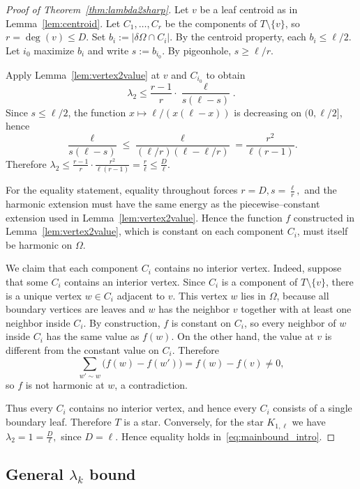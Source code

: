 \documentclass[11pt]{article}
\theoremstyle{definition}
\theoremstyle{remark}
\newcommand{\dO}{\delta\Omega}
\newcommand{\Om}{\Omega}
\begin{document}
\begin{proof}[Proof of Theorem~\ref{thm:lambda2sharp}]
Let $v$ be a leaf centroid as in Lemma~\ref{lem:centroid}.
Let $C_1,\dots,C_r$ be the components of $T\setminus\{v\}$, so $r=\deg(v)\le D$.
Set $b_i:=|\dO\cap C_i|$.
By the centroid property, each $b_i\le\ell/2$.
Let $i_0$ maximize $b_i$ and write $s:=b_{i_0}$.
By pigeonhole, $s\ge\ell/r$.

Apply Lemma~\ref{lem:vertex2value} at $v$ and $C_{i_0}$ to obtain
$$
\lambda_2\le \frac{r-1}{r}\cdot\frac{\ell}{s(\ell-s)}.
$$
Since $s\le\ell/2$, the function $x\mapsto\ell/(x(\ell-x))$ is decreasing on $(0,\ell/2]$, hence
$$
\frac{\ell}{s(\ell-s)}\le \frac{\ell}{(\ell/r)(\ell-\ell/r)}=\frac{r^2}{\ell(r-1)}.
$$
Therefore $\lambda_2\le \frac{r-1}{r}\cdot\frac{r^2}{\ell(r-1)}=\frac{r}{\ell}\le\frac{D}{\ell}$.

For the equality statement, equality throughout forces
$
r=D, s=\frac{\ell}{r},
$
and the harmonic extension must have the same energy as the piecewise--constant extension used in
Lemma~\ref{lem:vertex2value}. Hence the function $f$ constructed in Lemma~\ref{lem:vertex2value}, which is constant on each component
$C_i$, must itself be harmonic on $\Om$.

We claim that each component $C_i$ contains no interior vertex. Indeed, suppose that some $C_i$
contains an interior vertex. Since $C_i$ is a component of $T\setminus\{v\}$, there is a unique vertex
$w\in C_i$ adjacent to $v$. This vertex $w$ lies in $\Om$, because all boundary vertices are leaves
and $w$ has the neighbor $v$ together with at least one neighbor inside $C_i$. By construction, $f$
is constant on $C_i$, so every neighbor of $w$ inside $C_i$ has the same value as $f(w)$. On the other
hand, the value at $v$ is different from the constant value on $C_i$. Therefore
$$
\sum_{w'\sim w}\bigl(f(w)-f(w')\bigr)=f(w)-f(v)\neq 0,
$$
so $f$ is not harmonic at $w$, a contradiction.

Thus every $C_i$ contains no interior vertex, and hence every $C_i$ consists of a single boundary
leaf. Therefore $T$ is a star. Conversely, for the star $K_{1,\ell}$ we have
$
\lambda_2=1=\frac{D}{\ell},
$
since $D=\ell$. Hence equality holds in~\eqref{eq:mainbound_intro}.
\end{proof}


\subsection{General \texorpdfstring{$\lambda_k$}{lambda\_k} bound}\label{subsec:lambdak}
\end{document}
